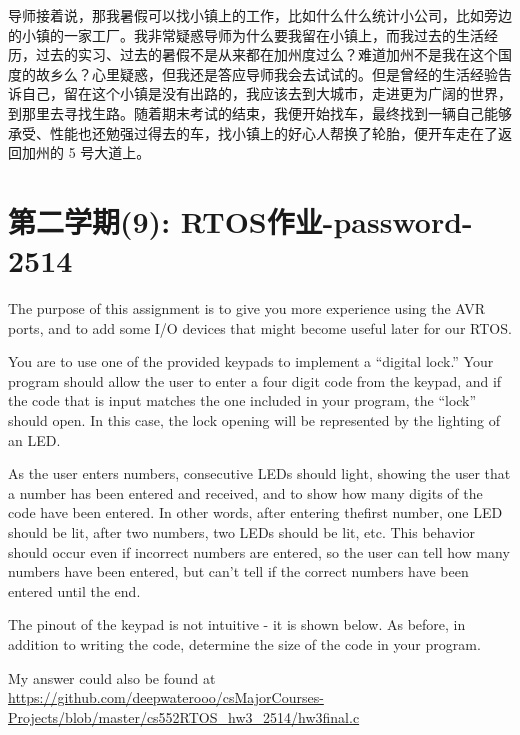 \documentclass[12pt]{book}
\begin{document}
导师接着说，那我暑假可以找小镇上的工作，比如什么什么统计小公司，比如旁边的小镇的一家工厂。我非常疑惑导师为什么要我留在小镇上，而我过去的生活经历，过去的实习、过去的暑假不是从来都在加州度过么？难道加州不是我在这个国度的故乡么？心里疑惑，但我还是答应导师我会去试试的。但是曾经的生活经验告诉自己，留在这个小镇是没有出路的，我应该去到大城市，走进更为广阔的世界，到那里去寻找生路。随着期末考试的结束，我便开始找车，最终找到一辆自己能够承受、性能也还勉强过得去的车，找小镇上的好心人帮换了轮胎，便开车走在了返回加州的 5 号大道上。

\section{第二学期(9): RTOS作业-password-2514}
\label{sec-4-9}

The purpose of this assignment is to give you more experience using the AVR ports, and to add some I/O devices that might become useful later for our RTOS.

You are to use one of the provided keypads to implement a “digital lock.” Your program should allow the user to enter a four digit code from the keypad, and if the code that is input matches the one included in your program, the “lock” should open. In this case, the lock opening will be represented by the lighting of an LED.

As the user enters numbers, consecutive LEDs should light, showing the user that a number has been entered and received, and to show how many digits of the code have been entered. In other words, after entering thefirst number, one LED should be lit, after two numbers, two LEDs should be lit, etc. This behavior should occur even if incorrect numbers are entered, so the user can tell how many numbers have been entered, but can’t tell if the correct numbers have been entered until the end.

The pinout of the keypad is not intuitive - it is shown below. As before, in addition to writing the code, determine the size of the code in your program.

My answer could also be found at \url{https://github.com/deepwaterooo/csMajorCourses-Projects/blob/master/cs552RTOS_hw3_2514/hw3final.c}
\end{document}

